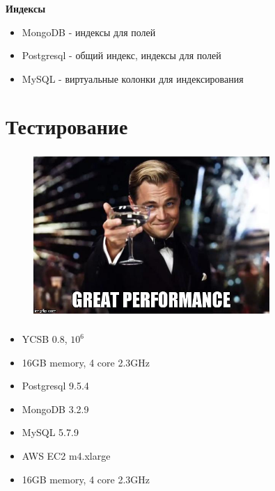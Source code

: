\documentclass[18pt, compress, aspectratio=169]{beamer}
\begin{document}
\begin{frame}
    \frametitle{}
    \textbf{Индексы}
    \begin{center}
        \begin{itemize}[label={\MVRightarrow}]
            \item MongoDB - индексы для полей
            \item Postgresql - общий индекс, индексы для полей
            \item MySQL - виртуальные колонки для индексирования
        \end{itemize}
    \end{center}
\end{frame}

\fontsize{13pt}{14}\selectfont
\section{Тестирование}
\fontsize{17pt}{18}\selectfont

\begin{frame}
    \frametitle{}
    \begin{center}
    \begin{figure}
        \includegraphics[width=0.8\textwidth,center]{great_performance.jpg}
    \end{figure}
    \end{center}
\end{frame}

\begin{frame}
    \frametitle{}
    \begin{center}
        \begin{itemize}[label={}]
            \item YCSB 0.8, $10^{6}$
            \item 16GB memory, 4 core 2.3GHz
            \item Postgresql 9.5.4
            \item MongoDB 3.2.9
            \item MySQL 5.7.9
            \item AWS EC2 m4.xlarge
            \item 16GB memory, 4 core 2.3GHz
        \end{itemize}
    \end{center}
\end{frame}
\end{document}
